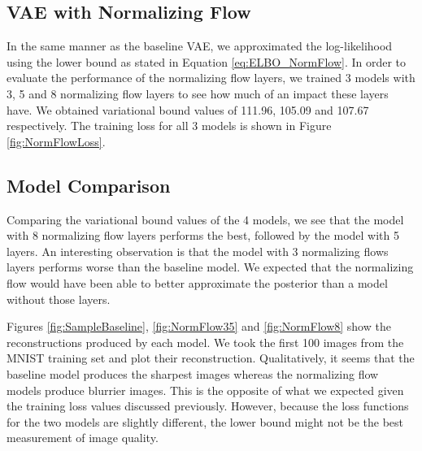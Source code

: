 \documentclass{article}
\begin{document}
\subsection{VAE with Normalizing Flow}
In the same manner as the baseline VAE, we approximated the log-likelihood using the lower bound
as stated in Equation \ref{eq:ELBO_NormFlow}. In order to evaluate the performance of the normalizing 
flow layers, we trained 3 models with 3, 5 and 8 normalizing flow layers to see how much of an impact 
these layers have. We obtained variational bound values of 111.96, 105.09 and 107.67 respectively.  
The training loss for all 3 models is shown in Figure \ref{fig:NormFlowLoss}.


\subsection{Model Comparison}
Comparing the variational bound values of the 4 models, we see that the model with 8 normalizing flow layers 
performs the best, followed by the model with 5 layers. An interesting observation is that the model with 
3 normalizing flows layers performs worse than the baseline model. We expected that the normalizing flow 
would have been able to better approximate the posterior than a model without those layers.

Figures \ref{fig:SampleBaseline}, \ref{fig:NormFlow35} and \ref{fig:NormFlow8} show the reconstructions 
produced by each model. We took the first 100 images from the MNIST training set and plot their reconstruction. 
Qualitatively, it seems that the baseline model produces the sharpest images whereas the normalizing flow 
models produce blurrier images. This is the opposite of what we expected given the training loss values discussed
previously. However, because the loss functions for the two models are slightly different, the lower bound might 
not be the best measurement of image quality.
\end{document}

